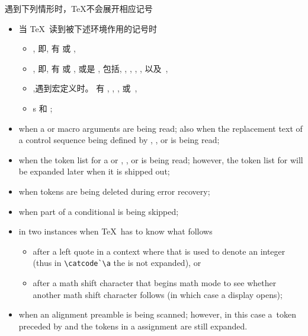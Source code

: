 \documentclass{book}
\begin{document}
遇到下列情形时，\TeX 不会展开相应记号
\begin{itemize}\label{noexp:list}
\item 当 \TeX\ 读到被下述环境作用的记号时
      
\begin{itemize} \item  {}, 即,
           有  或 ,
        \item  {}, 即,
           有  或 , 或是
           , 包括, ,
           , , ,
           以及~,
        \item {},遇到宏定义时。
           有 , , , 或~,
        \item {}s  和 ;
      \end{itemize}
\item when a  or macro arguments
      are being read; also when  the replacement text of a 
      control sequence
      being defined by , , or 
      is being read;
\item when the token list for a  or
      , , or 
      is being read; however, the token list for 
      will be  expanded later when it is shipped out;
\item when tokens are being deleted during error recovery;
\item when part of a conditional is being skipped;
\item in two instances when \TeX\ has to know what follows
      
\begin{itemize}\item after a left quote in a context where
         that is used to denote an integer (thus in 
         \verb-\catcode`\a- the  is not expanded), or
        \item after a math shift character that begins math mode
         to see whether another math shift character follows (in which case
         a display opens);
        \end{itemize}
\item when an alignment preamble is being scanned; however,
      in this case a~token
      preceded by  and the tokens in a  
      assignment are still expanded.
\end{itemize}
\end{document}

